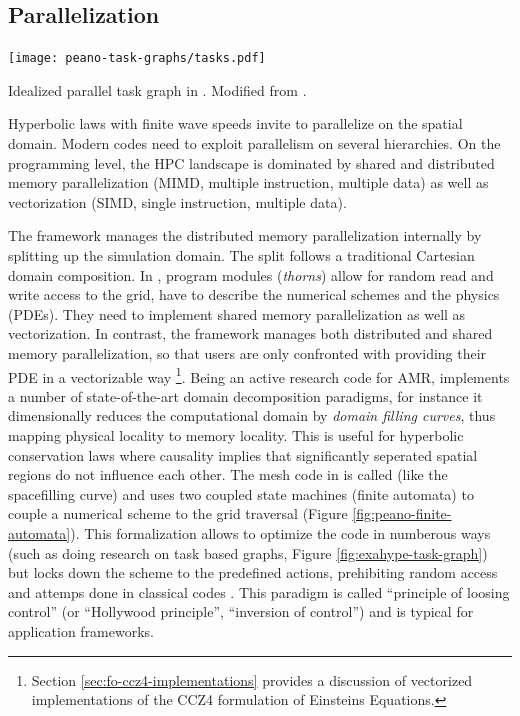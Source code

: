 \subsection{Parallelization}
\begin{marginfigure}
	\texttt{[image: peano-task-graphs/tasks.pdf]}
	\caption[
	  Idealized ExaHyPE/Peano task graph. Modiefied from \cite{exahype-review}.
	]{
		Idealized parallel task graph in .
		Modified from \cite{exahype-review}.
	}\label{fig:exahype-task-graph}
\end{marginfigure}
Hyperbolic laws with finite wave speeds invite to parallelize on the spatial
domain. Modern codes need to exploit parallelism on several hierarchies. On the
programming level, the HPC landscape is dominated by shared and distributed memory
parallelization (MIMD, multiple instruction, multiple data) as well as vectorization
(SIMD, single instruction, multiple data).

The  framework manages the distributed memory parallelization internally by
splitting up the simulation domain. The split follows a traditional Cartesian
domain composition. In , program modules (\emph{thorns}) 
allow for random read
and write access to the grid, have to describe the numerical schemes and the physics
(PDEs). They need to implement shared memory parallelization as well as
vectorization.
In contrast, the  framework manages both distributed and shared memory
parallelization, so that users are only confronted with providing their PDE in a
vectorizable way \footnote{
 Section \ref{sec:fo-ccz4-implementations} provides a discussion of
 vectorized implementations of the CCZ4 formulation of Einsteins Equations.}.
Being an active research code for AMR,  implements a number
of state-of-the-art domain
decomposition paradigms, for instance it dimensionally reduces the computational domain
by \emph{domain filling curves}, thus mapping physical locality to memory locality.
This is useful for hyperbolic conservation laws where causality implies that significantly
seperated spatial regions do not influence each other.
The mesh code in  is called  (like the spacefilling curve)
and uses two coupled state machines (finite automata) 
to couple a numerical scheme to the grid traversal
(Figure \ref{fig:peano-finite-automata}). This formalization
allows to optimize the code in numberous ways (such as doing research on task
based graphs, Figure \ref{fig:exahype-task-graph})
but locks down the
scheme to the predefined actions, prehibiting random access and
attemps done in classical codes \cite{Weinzierl2015}. This paradigm is called
``principle of loosing control'' (or ``Hollywood principle'', ``inversion of
control'') and is typical for application frameworks.

